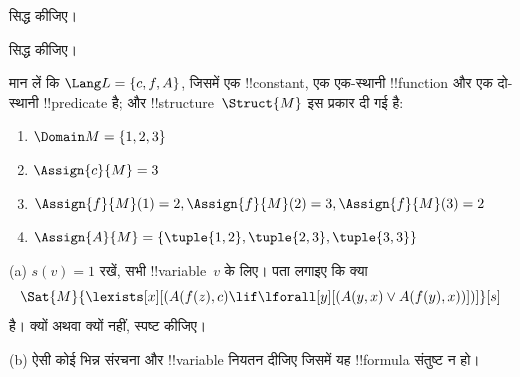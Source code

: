 \documentclass[../../../include/open-logic-section]{subfiles}
\begin{document}

\begin{prob}
   सिद्ध कीजिए।
\end{prob}
\tagendprob


\begin{prob}
   सिद्ध कीजिए।
\end{prob}
\tagendprob

\begin{prob}
मान लें कि $\Lang L = \{c, f, A\}$, जिसमें एक !!{constant}, एक एक-स्थानी
!!{function} और एक दो-स्थानी !!{predicate} है; और
!!{structure}~$\Struct{M}$ इस प्रकार दी गई है:
\begin{enumerate}
\item $\Domain M = \{1, 2, 3\}$
\item $\Assign{c}{M} = 3$
\item $\Assign{f}{M}(1) = 2, \Assign{f}{M}(2) = 3, \Assign{f}{M}(3) = 2$
\item $\Assign{A}{M} = \{\tuple{1, 2}, \tuple{2, 3}, \tuple{3, 3}\}$
\end{enumerate}
(a) $s(v) = 1$ रखें, सभी !!{variable}~$v$ के लिए। पता लगाइए कि क्या
\[
\Sat{M}{\lexists[x][(A(f(z), c) \lif \lforall[y][(A(y, x) \lor A(f(y),
      x))])]}[s]
\]
है। क्यों अथवा क्यों नहीं, स्पष्ट कीजिए।

(b) ऐसी कोई भिन्न संरचना और !!{variable} नियतन दीजिए जिसमें यह
!!{formula} संतुष्ट न हो।
\end{prob}
\end{document}
